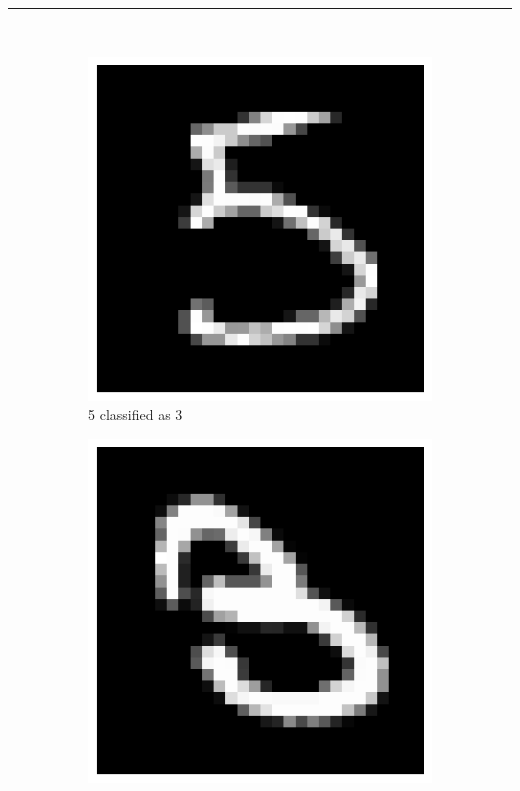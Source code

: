 \documentclass{article}
\begin{document}
\noindent\rule{\textwidth}{0.4pt}\\
\begin{figure}[H]
    \centering
    \begin{subfigure}[b]{0.3\textwidth}
        \centering
        \includegraphics[width=\textwidth]{digit1.png}
        \caption{5 classified as 3}
        \label{fig:digit1}
    \end{subfigure}
    \hfill
    \begin{subfigure}[b]{0.3\textwidth}
        \centering
        \includegraphics[width=\textwidth]{digit2.png}

\end{subfigure}
\end{figure}
\end{document}
